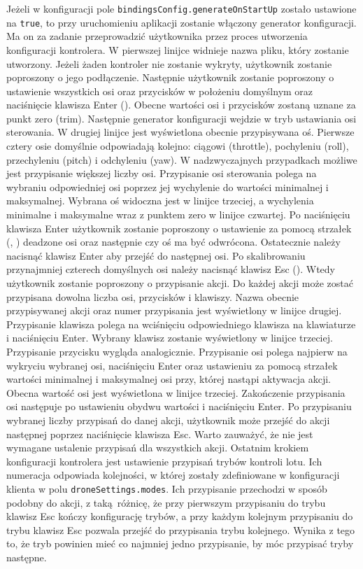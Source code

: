 \documentclass[15pt]{sprawozdanie}
\begin{document}
Jeżeli w konfiguracji pole \texttt{bindingsConfig.generateOnStartUp} zostało ustawione na \texttt{true}, to przy uruchomieniu aplikacji zostanie włączony generator konfiguracji. Ma on za zadanie przeprowadzić użytkownika przez proces utworzenia konfiguracji kontrolera. W pierwszej linijce widnieje nazwa pliku, który zostanie utworzony. Jeżeli żaden kontroler nie zostanie wykryty, użytkownik zostanie poproszony o jego podłączenie. Następnie użytkownik zostanie poproszony o ustawienie wszystkich osi oraz przycisków w położeniu domyślnym oraz naciśnięcie klawisza Enter (\keys{\return}). Obecne wartości osi i przycisków zostaną uznane za punkt zero (trim). Następnie generator konfiguracji wejdzie w tryb ustawiania osi sterowania. W drugiej linijce jest wyświetlona obecnie przypisywana oś. Pierwsze cztery osie domyślnie odpowiadają kolejno: ciągowi (throttle), pochyleniu (roll), przechyleniu (pitch) i odchyleniu (yaw). W nadzwyczajnych przypadkach możliwe jest przypisanie większej liczby osi. Przypisanie osi sterowania polega na wybraniu odpowiedniej osi poprzez jej wychylenie do wartości minimalnej i maksymalnej. Wybrana oś widoczna jest w linijce trzeciej, a wychylenia minimalne i maksymalne wraz z punktem zero w linijce czwartej. Po naciśnięciu klawisza Enter użytkownik zostanie poproszony o ustawienie za pomocą strzałek (\keys{\ \arrowkeyleft}, \keys{\arrowkeyright}) deadzone osi oraz następnie czy oś ma być odwrócona. Ostatecznie należy nacisnąć klawisz Enter aby przejść do następnej osi. Po skalibrowaniu przynajmniej czterech domyślnych osi należy nacisnąć klawisz Esc (\keys{\esc}). Wtedy użytkownik zostanie poproszony o przypisanie akcji. Do każdej akcji może zostać przypisana dowolna liczba osi, przycisków i klawiszy. Nazwa obecnie przypisywanej akcji oraz numer przypisania jest wyświetlony w linijce drugiej. Przypisanie klawisza polega na wciśnięciu odpowiedniego klawisza na klawiaturze i naciśnięciu Enter. Wybrany klawisz zostanie wyświetlony w linijce trzeciej. Przypisanie przycisku wygląda analogicznie. Przypisanie osi polega najpierw na wykryciu wybranej osi, naciśnięciu Enter oraz ustawieniu za pomocą strzałek wartości minimalnej i maksymalnej osi przy, której nastąpi aktywacja akcji. Obecna wartość osi jest wyświetlona w linijce trzeciej. Zakończenie przypisania osi następuje po ustawieniu obydwu wartości i naciśnięciu Enter. Po przypisaniu wybranej liczby przypisań do danej akcji, użytkownik może przejść do akcji następnej poprzez naciśnięcie klawisza Esc. Warto zauważyć, że nie jest wymagane ustalenie przypisań dla wszystkich akcji. Ostatnim krokiem konfiguracji kontrolera jest ustawienie przypisań trybów kontroli lotu. Ich numeracja odpowiada kolejności, w której zostały zdefiniowane w konfiguracji klienta w polu \texttt{droneSettings.modes}. Ich przypisanie przechodzi w sposób podobny do akcji, z taką różnicę, że przy pierwszym przypisaniu do trybu klawisz Esc kończy konfigurację trybów, a przy każdym kolejnym przypisaniu do trybu klawisz Esc pozwala przejść do przypisania trybu kolejnego. Wynika z tego to, że tryb powinien mieć co najmniej jedno przypisanie, by móc przypisać tryby następne.
\end{document}
